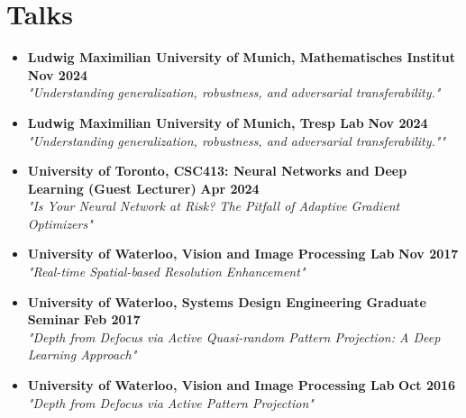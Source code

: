\section*{Talks}
\vspace{\postsubhead}
\begin{adjustwidth}{\indentleft}{\indentright}
  \begin{itemize}

    \item \textbf{Ludwig Maximilian University of Munich, Mathematisches Institut}
    \hfill
    \textbf{Nov 2024}\\
    \textit{"Understanding generalization, robustness, and adversarial transferability."}
    \vspace{\interlist}

    \item \textbf{Ludwig Maximilian University of Munich, Tresp Lab}
    \hfill
    \textbf{Nov 2024}\\
    \textit{"Understanding generalization, robustness, and adversarial transferability.""}
    \vspace{\interlist}

    \item \textbf{University of Toronto, CSC413: Neural Networks and Deep Learning (Guest Lecturer)}
    \hfill
    \textbf{Apr 2024}\\
    \textit{"Is Your Neural Network at Risk? The Pitfall of Adaptive Gradient Optimizers"}
    \vspace{\interlist}
    
    \item \textbf{University of Waterloo, Vision and Image Processing Lab}
    \hfill
    \textbf{Nov 2017}\\
    \textit{"Real-time Spatial-based Resolution Enhancement"}
    \vspace{\interlist}
    
    \item \textbf{University of Waterloo, Systems Design Engineering Graduate Seminar}
    \hfill
    \textbf{Feb 2017}\\
    \textit{"Depth from Defocus via Active Quasi-random Pattern Projection: A Deep Learning Approach"}
    \vspace{\interlist}
    
    \item \textbf{University of Waterloo, Vision and Image Processing Lab}
    \hfill
    \textbf{Oct 2016}\\
    \textit{"Depth from Defocus via Active Pattern Projection"}
    \vspace{\interlist}
    
  \end{itemize}
\end{adjustwidth}
